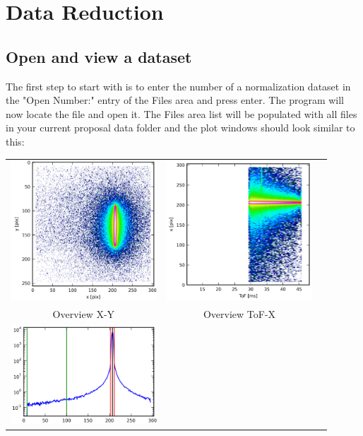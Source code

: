 \chapter{Data Reduction}
\label{chap:data_reduction}

\section{Open and view a dataset}
\label{sec:open_file}
  The first step to start with is to enter the number of a normalization dataset in the "Open Number:" entry of the Files area and press enter. The program will now locate the file and open it.
  The Files area list will be populated with all files in your current proposal data folder and the plot windows should look similar to this:
  
  \begin{tabular}{ccc}
  \includegraphics[width=155pt]{screenshots/normalizemap1.png} &
  \includegraphics[width=155pt]{screenshots/normalizemap2.png} &\\
  Overview X-Y & Overview ToF-X & \\
  \includegraphics[width=155pt]{screenshots/normalize1.png} &

\end{tabular}
